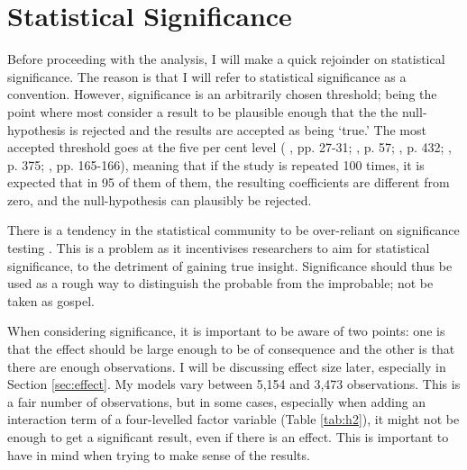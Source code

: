 \section{Statistical Significance}
Before proceeding with the analysis, I will make a quick rejoinder on statistical significance. The reason is that I will refer to statistical significance as a convention. However, significance is an arbitrarily chosen threshold; being the point where most consider a result to be plausible enough that the the null-hypothesis is rejected and the results are accepted as being `true.' The most accepted threshold goes at the five per cent level (\citeauthor{christophersen_introduksjon_2018} \citeyear{christophersen_introduksjon_2018}, pp. 27-31; \citeauthor{gelman_regression_2021} \citeauthor{gelman_regression_2021}, p. 57; \citeauthor{halperin_political_2020} \citeyear{halperin_political_2020},  p. 432; \citeauthor{hellevik_forskningsmetode_2002} \citeyear{hellevik_forskningsmetode_2002}, p. 375; \citeauthor{kellstedt_fundamentals_2018} \citeyear{kellstedt_fundamentals_2018}, pp. 165-166), meaning that if the study is repeated 100 times, it is expected that in 95 of them of them, the resulting coefficients are different from zero, and the null-hypothesis can plausibly be rejected.

There is a tendency in the statistical community to be over-reliant on significance testing \citep{barnett_examination_2019, gelman_regression_2021, imbens_statistical_2021, van_zwet_significance_2021}. This is a problem as it incentivises researchers to aim for statistical significance, to the detriment of gaining true insight. Significance should thus be used as a rough way to distinguish the probable from the improbable; not be taken as gospel.

When considering significance, it is important to be aware of two points: one is that the effect should be large enough to be of consequence and the other is that there are enough observations. I will be discussing effect size later, especially in Section \ref{sec:effect}. My models vary between 5,154 and 3,473 observations. This is a fair number of observations, but in some cases, especially when adding an interaction term of a four-levelled factor variable (Table \ref{tab:h2}), it might not be enough to get a significant result, even if there is an effect. This is important to have in mind when trying to make sense of the results.

